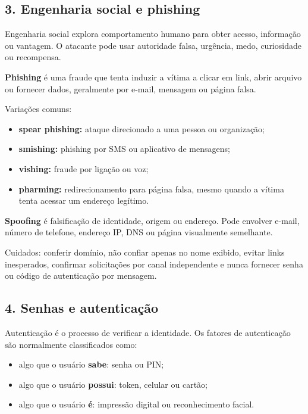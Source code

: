 \documentclass[11pt,a4paper]{article}
\begin{document}
\subsection*{3. Engenharia social e phishing}

Engenharia social explora comportamento humano para obter acesso, informação ou vantagem. O atacante pode usar autoridade falsa, urgência, medo, curiosidade ou recompensa.

\textbf{Phishing} é uma fraude que tenta induzir a vítima a clicar em link, abrir arquivo ou fornecer dados, geralmente por e-mail, mensagem ou página falsa.

Variações comuns:

\begin{itemize}
  \item \textbf{spear phishing:} ataque direcionado a uma pessoa ou organização;
  \item \textbf{smishing:} phishing por SMS ou aplicativo de mensagens;
  \item \textbf{vishing:} fraude por ligação ou voz;
  \item \textbf{pharming:} redirecionamento para página falsa, mesmo quando a vítima tenta acessar um endereço legítimo.
\end{itemize}

\textbf{Spoofing} é falsificação de identidade, origem ou endereço. Pode envolver e-mail, número de telefone, endereço IP, DNS ou página visualmente semelhante.

Cuidados: conferir domínio, não confiar apenas no nome exibido, evitar links inesperados, confirmar solicitações por canal independente e nunca fornecer senha ou código de autenticação por mensagem.

\subsection*{4. Senhas e autenticação}

Autenticação é o processo de verificar a identidade. Os fatores de autenticação são normalmente classificados como:

\begin{itemize}
  \item algo que o usuário \textbf{sabe}: senha ou PIN;
  \item algo que o usuário \textbf{possui}: token, celular ou cartão;
  \item algo que o usuário \textbf{é}: impressão digital ou reconhecimento facial.
\end{itemize}
\end{document}
